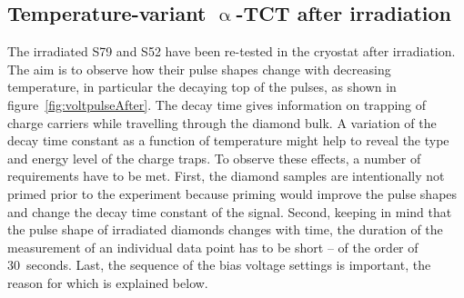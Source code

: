 \subsection{Temperature-variant $\upalpha$-TCT after irradiation}
\label{sec:afterirrad}
The irradiated S79 and S52 have been re-tested in the cryostat after irradiation. The aim is to observe how their pulse shapes change with decreasing temperature, in particular the decaying top of the pulses, as shown in figure~\ref{fig:voltpulseAfter}. The decay time gives information on trapping of charge carriers while travelling through the diamond bulk. A variation of the decay time constant as a function of temperature might help to reveal the type and energy level of the charge traps. To observe these effects, a number of requirements have to be met. First, the diamond samples are intentionally not primed prior to the experiment because priming would improve the pulse shapes and change the decay time constant of the signal. Second, keeping in mind that the pulse shape of irradiated diamonds changes with time, the duration of the measurement of an individual data point has to be short -- of the order of 30~seconds. Last, the sequence of the bias voltage settings is important, the reason for which is explained below.
